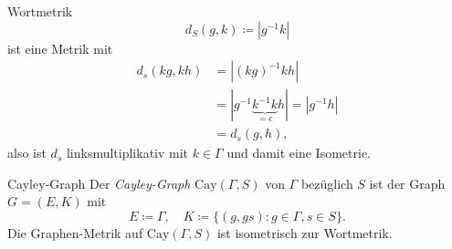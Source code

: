 \clearpage

\begin{definition}{Wortmetrik}
  \begin{equation*}
    d_S(g, k) \coloneqq |g^{-1}k|
  \end{equation*}
  ist eine Metrik mit
  \begin{align*}
    d_s(kg,kh) &= |(kg)^{-1}kh| \\ 
    &= |g^{-1}\underbrace{k^{-1}k}_{=e}h| = |g^{-1}h| \\
    &= d_s(g,h)\text{,}
  \end{align*}
  also ist $ d_s $ linksmultiplikativ mit $ k \in \Gamma $ und damit eine Isometrie.
\end{definition}

\begin{definition}{Cayley-Graph}
  Der \emph{Cayley-Graph} $ \text{Cay}(\Gamma, S) $ von $ \Gamma $ bezüglich $ S $ ist der Graph $ G = (E, K) $ mit
  \begin{equation*}
    E \coloneqq \Gamma, \quad K \coloneqq \{ (g, gs) : g \in \Gamma, s \in S \}\text{.}
  \end{equation*}
  Die Graphen-Metrik auf $ \text{Cay}(\Gamma, S) $ ist isometrisch zur Wortmetrik.
\end{definition}

